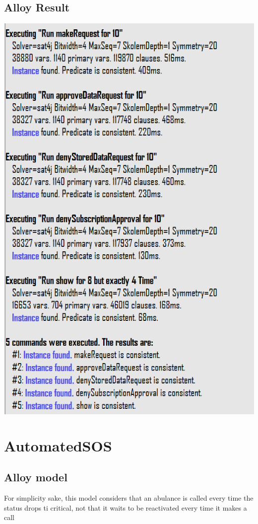 \subsection{Alloy Result}
\includegraphics[height = \textheight]{sections/alloy/resultD4H.png}

\section{AutomatedSOS}
\subsection{Alloy model}
For simplicity sake, this model considers that an abulance is called every time the status drops ti critical, not that it waits to be reactivated 
every time it makes a call

